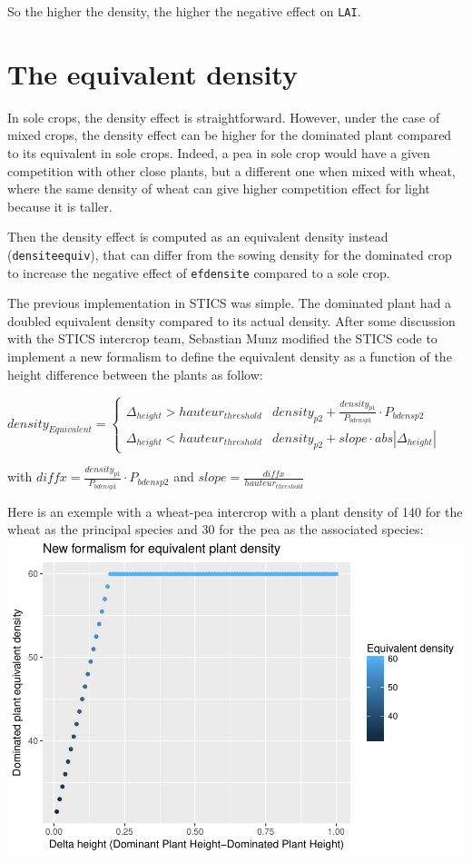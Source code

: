 \documentclass[]{book}
\theoremstyle{definition}
\theoremstyle{definition}
\theoremstyle{definition}
\theoremstyle{remark}
\begin{document}
So the higher the density, the higher the negative effect on
\texttt{LAI}.

\section{The equivalent density}\label{the-equivalent-density}

In sole crops, the density effect is straightforward. However, under the
case of mixed crops, the density effect can be higher for the dominated
plant compared to its equivalent in sole crops. Indeed, a pea in sole
crop would have a given competition with other close plants, but a
different one when mixed with wheat, where the same density of wheat can
give higher competition effect for light because it is taller.

Then the density effect is computed as an equivalent density instead
(\texttt{densiteequiv}), that can differ from the sowing density for the
dominated crop to increase the negative effect of \texttt{efdensite}
compared to a sole crop.

The previous implementation in STICS was simple. The dominated plant had
a doubled equivalent density compared to its actual density. After some
discussion with the STICS intercrop team, Sebastian Munz modified the
STICS code to implement a new formalism to define the equivalent density
as a function of the height difference between the plants as follow:

\(density_{Equivalent} =\begin{cases}\Delta_{height} > hauteur_{threshold} & density_{p2} + \frac{density_{p1}}{P_{bdensp1}}\cdot P_{bdensp2} \\ \Delta_{height} < hauteur_{threshold} & density_{p2}+slope\cdot abs\left|\Delta_{height}\right| \end{cases}\)

with \(diffx= \frac{density_{p1}}{P_{bdensp1}}\cdot P_{bdensp2}\) and
\(slope= \frac{diffx}{hauteur_{threshold}}\)

Here is an exemple with a wheat-pea intercrop with a plant density of
140 for the wheat as the principal species and 30 for the pea as the
associated species:
\includegraphics{Postdoc_steps_files/figure-latex/unnamed-chunk-14-1.pdf}
\end{document}
